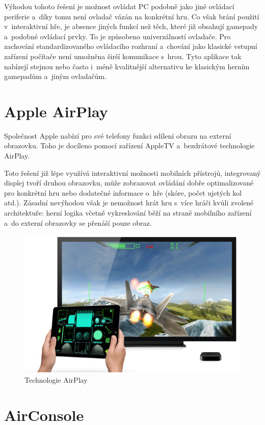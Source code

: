 \documentclass[thesis=B,czech,hidelinks]{FITthesis}[2012/06/26] %
\begin{document}
Výhodou tohoto řešení je možnost ovládat PC podobně jako jiné ovládací periferie a~díky tomu není ovladač vázán na konkrétní hru. Co však brání použití v~interaktivní hře, je absence jiných funkcí než těch, které již obsahují gamepady a~podobné ovládací prvky. To je způsobeno univerzálností ovladače. Pro zachování standardizovaného ovládacího rozhraní a~chování jako klasické vstupní zařízení počítače není umožněna širší komunikace s~hrou. Tyto aplikace tak nabízejí stejnou nebo často i~méně kvalitnější alternativu ke klasickým herním gamepadům a~jiným ovladačům. 

\section{Apple AirPlay}

Společnost Apple nabízí pro své telefony funkci sdílení obrazu na externí obrazovku. Toho je docíleno pomocí zařízení AppleTV a~bezdrátové technologie AirPlay\cite{airplay}.

Toto řešení již lépe využívá interaktivní možnosti mobilních přístrojů, integrovaný displej tvoří druhou obrazovku, může zobrazovat ovládání dobře optimalizované pro konkrétní hru nebo dodatečné informace o~hře (skóre, počet ujetých kol atd.). Zásadní nevýhodou však je nemožnost hrát hru s~více hráči kvůli zvolené architektuře: herní logika včetně vykreslování běží na straně mobilního zařízení a~do externí obrazovky se přenáší pouze obraz.

\begin{figure}[h]
\includegraphics[width=\textwidth]{airplay}
\caption{Technologie AirPlay\cite{airplay}}
\end{figure}


\section{AirConsole}
\end{document}
